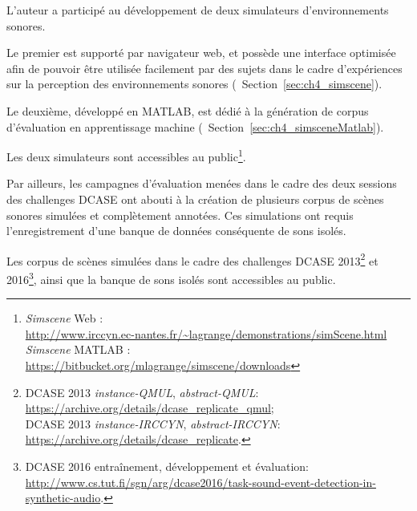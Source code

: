 L'auteur a participé au développement de deux simulateurs d’environnements sonores.

Le premier est supporté par navigateur web, et possède une interface optimisée afin de pouvoir être utilisée facilement par des sujets dans le cadre d'expériences sur la perception des environnements sonores (\cf~Section~\ref{sec:ch4_simscene}).

Le deuxième, développé en MATLAB, est dédié à la génération de corpus d'évaluation en apprentissage machine (\cf~Section~\ref{sec:ch4_simsceneMatlab}).

Les deux simulateurs sont accessibles au public\footnote{\emph{Simscene} Web : \\ \url{http://www.irccyn.ec-nantes.fr/~lagrange/demonstrations/simScene.html} \\ \emph{Simscene} MATLAB : \\ \url{https://bitbucket.org/mlagrange/simscene/downloads}}.

Par ailleurs, les campagnes d'évaluation menées dans le cadre des deux sessions des challenges DCASE ont abouti à la création de plusieurs corpus de scènes sonores simulées et complètement annotées. Ces simulations ont requis l'enregistrement d'une banque de données conséquente de sons isolés.

Les corpus de scènes simulées dans le cadre des challenges DCASE 2013\footnote{DCASE 2013 \emph{instance-QMUL}, \emph{abstract-QMUL}: \\ \url{https://archive.org/details/dcase_replicate_qmul}; \\ DCASE 2013 \emph{instance-IRCCYN}, \emph{abstract-IRCCYN}: \\ \url{https://archive.org/details/dcase_replicate}.} et 2016\footnote{DCASE 2016 entraînement, développement et évaluation: \\ \url{http://www.cs.tut.fi/sgn/arg/dcase2016/task-sound-event-detection-in-synthetic-audio}.}, ainsi que la banque de sons isolés sont accessibles au public.








